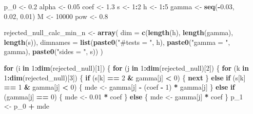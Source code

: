 \documentclass[
]{article}
\newenvironment{Shaded}{\begin{snugshade}}{\end{snugshade}}
\newcommand{\ControlFlowTok}[1]{\textcolor[rgb]{0.13,0.29,0.53}{\textbf{#1}}}
\newcommand{\DataTypeTok}[1]{\textcolor[rgb]{0.13,0.29,0.53}{#1}}
\newcommand{\DecValTok}[1]{\textcolor[rgb]{0.00,0.00,0.81}{#1}}
\newcommand{\FloatTok}[1]{\textcolor[rgb]{0.00,0.00,0.81}{#1}}
\newcommand{\KeywordTok}[1]{\textcolor[rgb]{0.13,0.29,0.53}{\textbf{#1}}}
\newcommand{\NormalTok}[1]{#1}
\newcommand{\OperatorTok}[1]{\textcolor[rgb]{0.81,0.36,0.00}{\textbf{#1}}}
\newcommand{\StringTok}[1]{\textcolor[rgb]{0.31,0.60,0.02}{#1}}
\begin{document}
\begin{Shaded}
\begin{Highlighting}[]
{\NormalTok{p_}\DecValTok{0}\NormalTok{ <-}\StringTok{ }\FloatTok{0.2}
\NormalTok{alpha <-}\StringTok{ }\FloatTok{0.05}
\NormalTok{coef <-}\StringTok{ }\FloatTok{1.3}
\NormalTok{s <-}\StringTok{ }\DecValTok{1}\OperatorTok{:}\DecValTok{2}
\NormalTok{h <-}\StringTok{ }\DecValTok{1}\OperatorTok{:}\DecValTok{5}
\NormalTok{gamma <-}\StringTok{ }\KeywordTok{seq}\NormalTok{(}\OperatorTok{-}\FloatTok{0.03}\NormalTok{, }\FloatTok{0.02}\NormalTok{, }\FloatTok{0.01}\NormalTok{)}
\NormalTok{M <-}\StringTok{ }\DecValTok{10000}
\NormalTok{pow <-}\StringTok{ }\FloatTok{0.8}

\NormalTok{rejected_null_calc_min_n <-}\StringTok{ }\KeywordTok{array}\NormalTok{(}
  \DataTypeTok{dim =} \KeywordTok{c}\NormalTok{(}\KeywordTok{length}\NormalTok{(h), }\KeywordTok{length}\NormalTok{(gamma), }\KeywordTok{length}\NormalTok{(s)),}
  \DataTypeTok{dimnames =} \KeywordTok{list}\NormalTok{(}\KeywordTok{paste0}\NormalTok{(}\StringTok{"#tests = "}\NormalTok{, h), }\KeywordTok{paste0}\NormalTok{(}\StringTok{"gamma = "}\NormalTok{, gamma), }\KeywordTok{paste0}\NormalTok{(}\StringTok{"sides = "}\NormalTok{, s))}
\NormalTok{)}

\ControlFlowTok{for}\NormalTok{ (i }\ControlFlowTok{in} \DecValTok{1}\OperatorTok{:}\KeywordTok{dim}\NormalTok{(rejected_null)[}\DecValTok{1}\NormalTok{]) \{}
  \ControlFlowTok{for}\NormalTok{ (j }\ControlFlowTok{in} \DecValTok{1}\OperatorTok{:}\KeywordTok{dim}\NormalTok{(rejected_null)[}\DecValTok{2}\NormalTok{]) \{}
    \ControlFlowTok{for}\NormalTok{ (k }\ControlFlowTok{in} \DecValTok{1}\OperatorTok{:}\KeywordTok{dim}\NormalTok{(rejected_null)[}\DecValTok{3}\NormalTok{]) \{}
      \ControlFlowTok{if}\NormalTok{ (s[k] }\OperatorTok{==}\StringTok{ }\DecValTok{2} \OperatorTok{&}\StringTok{ }\NormalTok{gamma[j] }\OperatorTok{<}\StringTok{ }\DecValTok{0}\NormalTok{) \{}
        \ControlFlowTok{next}
\NormalTok{      \} }\ControlFlowTok{else} \ControlFlowTok{if}\NormalTok{ (s[k] }\OperatorTok{==}\StringTok{ }\DecValTok{1} \OperatorTok{&}\StringTok{ }\NormalTok{gamma[j] }\OperatorTok{<}\StringTok{ }\DecValTok{0}\NormalTok{) \{}
\NormalTok{        mde <-}\StringTok{ }\NormalTok{gamma[j] }\OperatorTok{-}\StringTok{ }\NormalTok{(coef }\OperatorTok{-}\StringTok{ }\DecValTok{1}\NormalTok{) }\OperatorTok{*}\StringTok{ }\NormalTok{gamma[j]}
\NormalTok{      \} }\ControlFlowTok{else} \ControlFlowTok{if}\NormalTok{ (gamma[j] }\OperatorTok{==}\StringTok{ }\DecValTok{0}\NormalTok{) \{}
\NormalTok{        mde <-}\StringTok{ }\FloatTok{0.01} \OperatorTok{*}\StringTok{ }\NormalTok{coef}
\NormalTok{      \} }\ControlFlowTok{else}\NormalTok{ \{}
\NormalTok{        mde <-}\StringTok{ }\NormalTok{gamma[j] }\OperatorTok{*}\StringTok{ }\NormalTok{coef}
\NormalTok{      \}}
\NormalTok{      p_}\DecValTok{1}\NormalTok{ <-}\StringTok{ }\NormalTok{p_}\DecValTok{0} \OperatorTok{+}\StringTok{ }\NormalTok{mde}

}
\end{Highlighting}
\end{Shaded}
\end{document}

